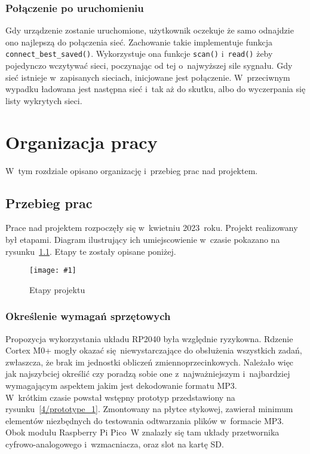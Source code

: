 \documentclass[polish]{aghengthesis}
\newcommand{\imgint}[4]{
	\begin{figure}[{#4}]
		\centering
		\texttt{[image: \#1]}
		\caption{#2}
		\label{#1}
	\end{figure}
}
\newcommand{\imgh}[3]{\imgint{#1}{#2}{#3}{H}}
\begin{document}
		\subsection{Połączenie po uruchomieniu}
			Gdy urządzenie zostanie uruchomione, użytkownik oczekuje że samo odnajdzie ono najlepszą do połączenia sieć. Zachowanie takie implementuje funkcja \lstinline|connect_best_saved()|. Wykorzystuje ona funkcje \lstinline|scan()| i~\lstinline|read()| żeby pojedynczo wczytywać sieci, poczynając od tej o~najwyższej sile sygnału. Gdy sieć istnieje w~zapisanych sieciach, inicjowane jest połączenie. W~przeciwnym wypadku ładowana jest następna sieć i~tak aż do skutku, albo do wyczerpania się listy wykrytych sieci.
			
\cleardoublepage
\chapter{Organizacja pracy}
	W~tym rozdziale opisano organizację i~przebieg prac nad projektem.
	
	\section{Przebieg prac}
		Prace nad projektem rozpoczęły się w~kwietniu 2023~roku.
		Projekt realizowany był etapami.
		Diagram ilustrujący ich umiejscowienie w~czasie pokazano na rysunku~\ref{4/PicoRadio-steps}.
		Etapy te zostały opisane poniżej.
		
		\imgh{4/PicoRadio-steps}{Etapy projektu}{1}
		
		\subsection{Określenie wymagań sprzętowych}
			Propozycja wykorzystania układu RP2040 była względnie ryzykowna. Rdzenie Cortex M0+ mogły okazać się niewystarczające do obsłużenia wszystkich zadań, zwłaszcza, że brak im jednostki obliczeń zmiennoprzecinkowych. Należało więc jak najszybciej określić czy poradzą sobie one z~najważniejszym i~najbardziej wymagającym aspektem jakim jest dekodowanie formatu MP3.
			$ $\\
			
			W~krótkim czasie powstał wstępny prototyp przedstawiony na rysunku~\ref{4/prototype_1}. Zmontowany na płytce stykowej, zawierał minimum elementów niezbędnych do testowania odtwarzania plików w~formacie MP3. Obok modułu Raspberry Pi Pico~W znalazły się tam układy przetwornika cyfrowo-analogowego i~wzmacniacza, oraz slot na kartę SD.
			
\end{document}
